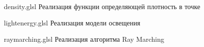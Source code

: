 \begin{appendices}
	\chapter{}
	\label{app:listings}
	
	{density.glsl} %
	{} %
	{Реализация функции определяющей плотность в точке} %
	
	\clearpage
	
	{lightenergy.glsl} %
	{} %
	{Реализация модели освещения} %
	
	\clearpage
	
	{raymarching.glsl} %
	{} %
	{Реализация алгоритма Ray Marching} %
	
\end{appendices}